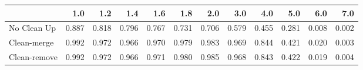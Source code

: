 \begin{tabular}{lrrrrrrrrrrr}
\toprule
{} &   1.0 &   1.2 &   1.4 &   1.6 &   1.8 &   2.0 &   3.0 &   4.0 &   5.0 &   6.0 &   7.0 \\
\midrule
No Clean Up  & 0.887 & 0.818 & 0.796 & 0.767 & 0.731 & 0.706 & 0.579 & 0.455 & 0.281 & 0.008 & 0.002 \\
Clean-merge  & 0.992 & 0.972 & 0.966 & 0.970 & 0.979 & 0.983 & 0.969 & 0.844 & 0.421 & 0.020 & 0.003 \\
Clean-remove & 0.992 & 0.972 & 0.966 & 0.971 & 0.980 & 0.985 & 0.968 & 0.843 & 0.422 & 0.019 & 0.004 \\
\bottomrule
\end{tabular}

